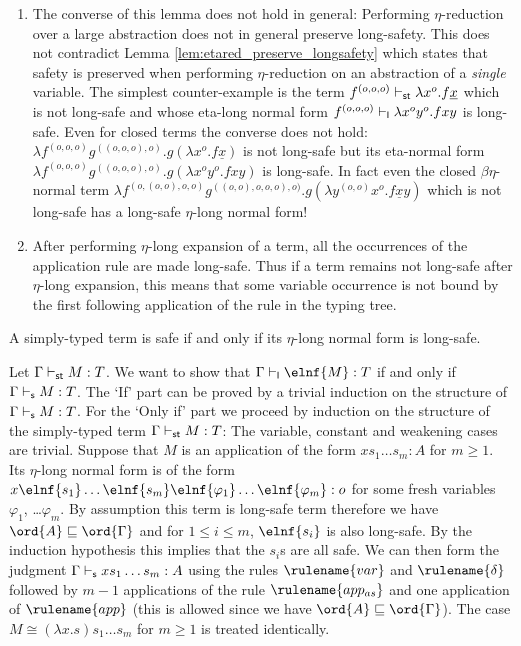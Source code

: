 \begin{remark}\hfill
\begin{enumerate}
\item
The converse of this lemma does not hold in general: Performing
$\eta$-reduction over a large abstraction does not in general
preserve long-safety. This does not contradict Lemma
  \ref{lem:etared_preserve_longsafety} which states that safety is
  preserved when performing $\eta$-reduction on an abstraction
  of a \emph{single} variable. The simplest counter-example is
  the
 term $f^{(o,o,o)} \vdash_{\sf st} \lambda x^o . f \underline{x}$ which is not long-safe and
whose eta-long normal form $f^{(o,o,o)} \vdash_{\sf l} \lambda x^o y^o .
f x y$ is long-safe. Even for closed terms the converse does not
hold: $\lambda f^{(o,o,o)} g^{((o,o,o),o)} . g(\lambda x^o . f
\underline{x})$ is not long-safe but its eta-normal form $\lambda f^{(o,o,o)}
g^{((o,o,o),o)} . g(\lambda x^o y^o. f x y)$ is long-safe. In fact
even the closed $\beta\eta$-normal term $\lambda
f^{(o,(o,o),o,o)} g^{((o,o),o,o,o),o)} . g(\lambda y^{(o,o)} x^o
. f \underline{x} y)$ which is not long-safe has a long-safe $\eta$-long normal form!

  \item After performing $\eta$-long expansion of a term, all the occurrences of the application rule are made long-safe. Thus if a term remains not long-safe after $\eta$-long expansion, this means that
  some variable occurrence is not bound by the
  first following application of the  rule in the
  typing tree.
  \end{enumerate}
\end{remark}

\begin{lemma}
  \label{lem:safe_iff_etalong_lsafe}
  A simply-typed term is safe if and only if its $\eta$-long normal form is long-safe.
\end{lemma}
\proof
Let $\Gamma \vdash_{\sf st} M : T$. We want to show that
$\Gamma \lsentail \elnf{M} : T$ if and only if
$\Gamma \vdash_{\sf s} M : T$.
The `If' part can be proved by a trivial induction on the structure of $\Gamma \vdash_{\sf s} M : T$.
For the `Only if' part we proceed by induction on the structure of the simply-typed term $\Gamma \vdash_{\sf st} M : T$: The variable, constant and weakening cases are trivial. Suppose that $M$ is an application of the form
$x s_1 \ldots s_m : A$ for $m\geq 1$. Its $\eta$-long normal form is
of the form $x \elnf{s_1} \ldots \elnf{s_m} \elnf{\varphi_1} \ldots \elnf{\varphi_m}: o$ for some fresh variables $\varphi_1$, \ldots $\varphi_m$.
By assumption this term is long-safe term therefore we have $\ord{A}\sqsubseteq\ord{\Gamma}$ and for $1\leq i \leq m$, $\elnf{s_i}$ is also long-safe. By the induction hypothesis this implies that
the $s_i$s are all safe. We can then form the judgment
$\Gamma \vdash_{\sf s} x s_1 \ldots s_m : A$ using the
rules $\rulename{var}$ and $\rulename{\delta}$ followed by $m-1$ applications of the rule $\rulename{app_{as}}$ and one application of
$\rulename{app}$ (this is allowed since we have $\ord{A}\sqsubseteq\ord{\Gamma}$).
The case $M\cong (\lambda x. s) s_1 \ldots s_m$ for $m\geq 1$ is treated identically.

